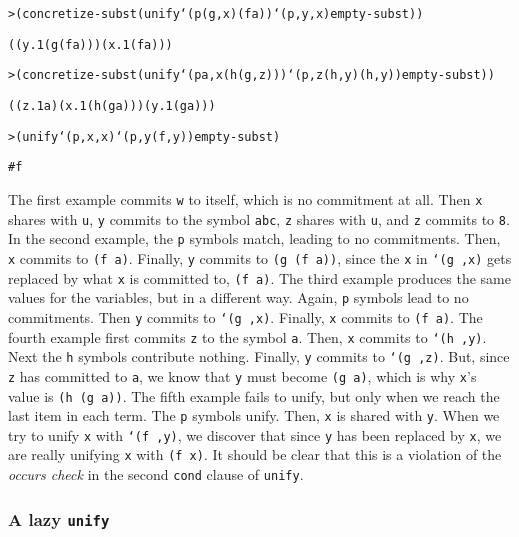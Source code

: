 \begin{alltt}
> (concretize-subst (unify `(p (g ,x) (f a)) `(p ,y ,x) empty-subst))

((y.1 (g (f a))) (x.1 (f a)))
\end{alltt}

\begin{alltt}
> (concretize-subst (unify `(p a ,x (h (g ,z))) `(p ,z (h ,y) (h ,y)) empty-subst))

((z.1 a) (x.1 (h (g a))) (y.1 (g a)))
\end{alltt}

\begin{alltt}
> (unify `(p ,x ,x) `(p ,y (f ,y)) empty-subst)

#f
\end{alltt}

\noindent
The first example commits \texttt{w} to itself, which is no commitment
at all.  Then \texttt{x} shares with \texttt{u}, \texttt{y} commits to
the symbol \texttt{abc}, \texttt{z} shares with \texttt{u}, and
\texttt{z} commits to \texttt{8}.  In the second example, the
\texttt{p} symbols match, leading to no commitments.  Then, \texttt{x}
commits to \texttt{(f a)}.  Finally, \texttt{y} commits to \texttt{(g
(f a))}, since the \texttt{x} in \texttt{`(g ,x)} gets replaced by
what \texttt{x} is committed to, \texttt{(f a)}.  The third example
produces the same values for the variables, but in a different way.
Again, \texttt{p} symbols lead to no commitments.  Then \texttt{y}
commits to \texttt{`(g ,x)}. Finally, \texttt{x} commits to \texttt{(f
a)}.  The fourth example first commits \texttt{z} to the symbol
\texttt{a}.  Then, \texttt{x} commits to \texttt{`(h ,y)}. Next the
\texttt{h} symbols contribute nothing.  Finally, \texttt{y} commits to
\texttt{`(g ,z)}.  But, since \texttt{z} has committed to \texttt{a},
we know that \texttt{y} must become \texttt{(g a)}, which is why
\texttt{x}'s value is \texttt{(h (g a))}.  The fifth example fails to
unify, but only when we reach the last item in each term.  The
\texttt{p} symbols unify.  Then, \texttt{x} is shared with \texttt{y}.
When we try to unify \texttt{x} with \texttt{`(f ,y)}, we discover
that since \texttt{y} has been replaced by \texttt{x}, we are really
unifying \texttt{x} with \texttt{(f x)}.  It should be clear that this
is a violation of the \emph{occurs check} in the second \texttt{cond}
clause of \texttt{unify}.

\subsubsection{A lazy \texttt{unify}}

